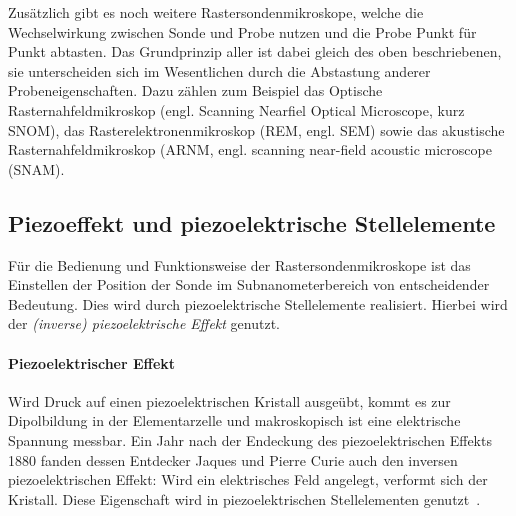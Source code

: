 \documentclass[a4paper,twoside,final]{article}
\begin{document}
Zusätzlich gibt es noch weitere Rastersondenmikroskope, welche die Wechselwirkung zwischen Sonde und Probe nutzen und die Probe Punkt für Punkt abtasten. Das Grundprinzip aller ist dabei gleich des oben beschriebenen, sie unterscheiden sich im Wesentlichen durch die Abstastung anderer Probeneigenschaften. Dazu zählen zum Beispiel das Optische Rasternahfeldmikroskop (engl. Scanning Nearfiel Optical Microscope, kurz SNOM), das Rasterelektronenmikroskop (REM, engl. SEM) sowie das akustische Rasternahfeldmikroskop (ARNM, engl. scanning near-field acoustic microscope (SNAM).

\subsection{Piezoeffekt und piezoelektrische Stellelemente}
Für die Bedienung und Funktionsweise der Rastersondenmikroskope ist das Einstellen der Position der Sonde im Subnanometerbereich von entscheidender Bedeutung. Dies wird durch piezoelektrische Stellelemente realisiert. Hierbei wird der \textit{(inverse) piezoelektrische Effekt} genutzt.
\paragraph{Piezoelektrischer Effekt} Wird Druck auf einen piezoelektrischen Kristall ausgeübt, kommt es zur Dipolbildung in der Elementarzelle und makroskopisch ist eine elektrische Spannung messbar. Ein Jahr nach der Endeckung des piezoelektrischen Effekts 1880 fanden dessen Entdecker Jaques und Pierre Curie auch den inversen piezoelektrischen Effekt: Wird ein elektrisches Feld angelegt, verformt sich der Kristall. Diese Eigenschaft wird in piezoelektrischen Stellelementen genutzt~\cite{Versuchsanleitung}.
\end{document}
